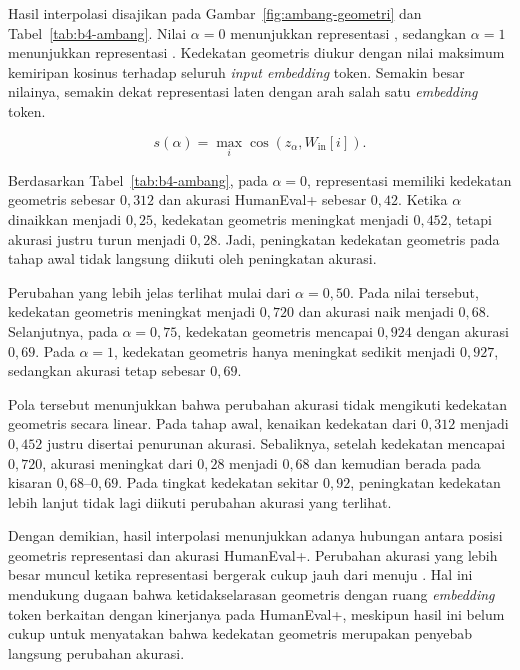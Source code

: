 Hasil interpolasi disajikan pada Gambar~\ref{fig:ambang-geometri} dan
Tabel~\ref{tab:b4-ambang}. Nilai $\alpha=0$ menunjukkan representasi ,
sedangkan $\alpha=1$ menunjukkan representasi . Kedekatan
geometris diukur dengan nilai maksimum kemiripan kosinus terhadap seluruh
\textit{input embedding} token. Semakin besar nilainya, semakin dekat
representasi laten dengan arah salah satu \textit{embedding} token.

\begin{equation}
    s(\alpha)
    =
    \max_i
    \cos\left(
    z_{\alpha},W_{\mathrm{in}}[i]
    \right).
    \label{eq:kedekatan-geometris}
\end{equation}



Berdasarkan Tabel~\ref{tab:b4-ambang}, pada $\alpha=0$, representasi
 memiliki kedekatan geometris sebesar $0{,}312$ dan akurasi
HumanEval+ sebesar $0{,}42$. Ketika $\alpha$ dinaikkan menjadi $0{,}25$,
kedekatan geometris meningkat menjadi $0{,}452$, tetapi akurasi justru turun
menjadi $0{,}28$. Jadi, peningkatan kedekatan geometris pada tahap awal tidak
langsung diikuti oleh peningkatan akurasi.

Perubahan yang lebih jelas terlihat mulai dari $\alpha=0{,}50$. Pada nilai
tersebut, kedekatan geometris meningkat menjadi $0{,}720$ dan akurasi naik
menjadi $0{,}68$. Selanjutnya, pada $\alpha=0{,}75$, kedekatan geometris
mencapai $0{,}924$ dengan akurasi $0{,}69$. Pada $\alpha=1$, kedekatan
geometris hanya meningkat sedikit menjadi $0{,}927$, sedangkan akurasi tetap
sebesar $0{,}69$.

Pola tersebut menunjukkan bahwa perubahan akurasi tidak mengikuti kedekatan
geometris secara linear. Pada tahap awal, kenaikan kedekatan dari $0{,}312$
menjadi $0{,}452$ justru disertai penurunan akurasi. Sebaliknya, setelah
kedekatan mencapai $0{,}720$, akurasi meningkat dari $0{,}28$ menjadi
$0{,}68$ dan kemudian berada pada kisaran $0{,}68$--$0{,}69$. Pada tingkat
kedekatan sekitar $0{,}92$, peningkatan kedekatan lebih lanjut tidak lagi
diikuti perubahan akurasi yang terlihat.

Dengan demikian, hasil interpolasi menunjukkan adanya hubungan antara posisi
geometris representasi dan akurasi HumanEval+. Perubahan akurasi yang lebih besar muncul
ketika representasi bergerak cukup jauh dari  menuju .
Hal ini mendukung dugaan bahwa ketidakselarasan geometris  dengan
ruang \textit{embedding} token berkaitan dengan kinerjanya pada HumanEval+,
meskipun hasil ini belum cukup untuk menyatakan bahwa kedekatan geometris
merupakan penyebab langsung perubahan akurasi.

